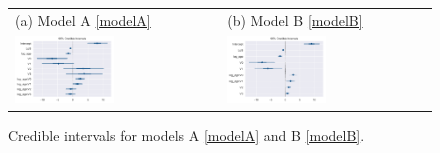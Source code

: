 \begin{figure}
  \centering
    \begin{tabular}{ll}
(a) Model A \eqref{modelA} & (b) Model B \eqref{modelB}\\
\includegraphics[width=0.5\textwidth]{images/DS19fm0_c0__forestplot_model_A.pdf}&
\includegraphics[width=0.5\textwidth]{images/DS19fk1_c0__forestplot_model_B}\\
\end{tabular}
    \caption{Credible intervals for models A \eqref{modelA} and B \eqref{modelB}.}
    \label{fig:forest_plots}
\end{figure}

\begin{table}
\caption{\label{tab:coeff} Coefficients of model B. Rhat is the
  potential scale reduction factor. A value of one indicates
  convergence.}
\centering

\end{table}


